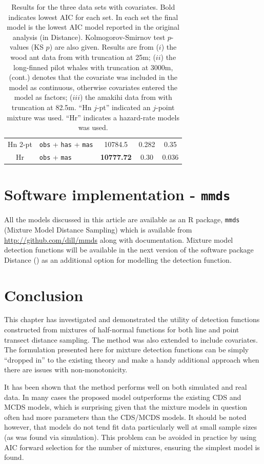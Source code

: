 \begin{table}
\begin{tabular}{c l c c c}
Hn 2-pt & \texttt{obs} + \texttt{has} + \texttt{mas} & 10784.5 & 0.282 &  0.35\\
Hr & \texttt{obs} + \texttt{mas} & \textbf{10777.72} & 0.30 & 0.036 \\
\end{tabular}
\caption{Results for the three data sets with covariates. Bold indicates lowest AIC for each set. In each set the final model is the lowest AIC model reported in the original analysis (in Distance). Kolmogorov-Smirnov test $p$-values (KS $p$) are also given. Results are from ($i$) the wood ant data from  with truncation at 25m; ($ii$) the long-finned pilot whales  with truncation at 3000m, (cont.) denotes that the covariate was included in the model as continuous, otherwise covariates entered the model as factors; ($iii$) the amakihi data from  with truncation at 82.5m. ``Hn $j$-pt'' indicated an $j$-point mixture was used. ``Hr'' indicates a hazard-rate models was used.}
\label{big-results-table}
\end{table}


\section{Software implementation - \texttt{mmds}}
\label{mix-software}

All the models discussed in this article are available as an \textsf{R} package, \texttt{mmds} (Mixture Model Distance Sampling) which is available from \url{http://github.com/dill/mmds} along with documentation. Mixture model detection functions will be available in the next version of the software package Distance (\cite{distance-software}) as an additional option for modelling the detection function.

\section{Conclusion}
\label{s:discuss}

This chapter has investigated and demonstrated the utility of detection functions constructed from mixtures of half-normal functions for both line and point transect distance sampling. The method was also extended to include covariates. The formulation presented here for mixture detection functions can be simply ``dropped in'' to the existing theory and make a handy additional approach when there are issues with non-monotonicity.

It has been shown that the method performs well on both simulated and real data. In many cases the proposed model outperforms the existing CDS and MCDS models, which is surprising given that the mixture models in question often had more parameters than the CDS/MCDS models. It should be noted however, that models do not tend fit data particularly well at small sample sizes (as was found via simulation). This problem can be avoided in practice by using AIC forward selection for the number of mixtures, ensuring the simplest model is found.

